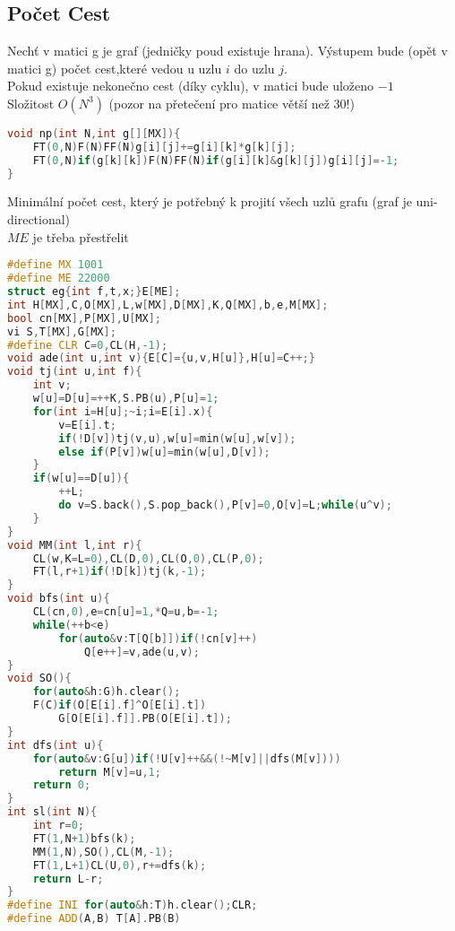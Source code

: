 \documentclass[11pt]{article}
\begin{document}
\subsection{Počet Cest}
Nechť v matici \textsf{g} je graf (jedničky poud existuje hrana). Výstupem bude (opět v matici \textsf{g}) počet cest,které vedou u uzlu $i$ do uzlu $j$.
\\Pokud existuje nekonečno cest (díky cyklu), v matici bude uloženo $-1$
\\Složitost $O(N^3)$ (pozor na přetečení pro matice větší než 30!)
\begin{lstlisting}[language=C++]
void np(int N,int g[][MX]){
    FT(0,N)F(N)FF(N)g[i][j]+=g[i][k]*g[k][j];
    FT(0,N)if(g[k][k])F(N)FF(N)if(g[i][k]&g[k][j])g[i][j]=-1;
}
\end{lstlisting}
Minimální počet cest, který je potřebný k projití všech uzlů grafu (graf je uni-directional)
\\$ME$ je třeba přestřelit
\begin{lstlisting}[language=C++]
#define MX 1001
#define ME 22000
struct eg{int f,t,x;}E[ME];
int H[MX],C,O[MX],L,w[MX],D[MX],K,Q[MX],b,e,M[MX];
bool cn[MX],P[MX],U[MX];
vi S,T[MX],G[MX];
#define CLR C=0,CL(H,-1);
void ade(int u,int v){E[C]={u,v,H[u]},H[u]=C++;}
void tj(int u,int f){
    int v;
    w[u]=D[u]=++K,S.PB(u),P[u]=1;
    for(int i=H[u];~i;i=E[i].x){
        v=E[i].t;
        if(!D[v])tj(v,u),w[u]=min(w[u],w[v]);
        else if(P[v])w[u]=min(w[u],D[v]);
    }
    if(w[u]==D[u]){
        ++L;
        do v=S.back(),S.pop_back(),P[v]=0,O[v]=L;while(u^v);
    }
}
void MM(int l,int r){
    CL(w,K=L=0),CL(D,0),CL(O,0),CL(P,0);
    FT(l,r+1)if(!D[k])tj(k,-1);
}
void bfs(int u){
    CL(cn,0),e=cn[u]=1,*Q=u,b=-1;
    while(++b<e)
        for(auto&v:T[Q[b]])if(!cn[v]++)
            Q[e++]=v,ade(u,v);
}
void SO(){
    for(auto&h:G)h.clear();
    F(C)if(O[E[i].f]^O[E[i].t])
        G[O[E[i].f]].PB(O[E[i].t]);
}
int dfs(int u){
    for(auto&v:G[u])if(!U[v]++&&(!~M[v]||dfs(M[v])))
        return M[v]=u,1;
    return 0;
}
int sl(int N){
    int r=0;
    FT(1,N+1)bfs(k);
    MM(1,N),SO(),CL(M,-1);
    FT(1,L+1)CL(U,0),r+=dfs(k);
    return L-r;
}
#define INI for(auto&h:T)h.clear();CLR;
#define ADD(A,B) T[A].PB(B)
\end{lstlisting}
\end{document}
